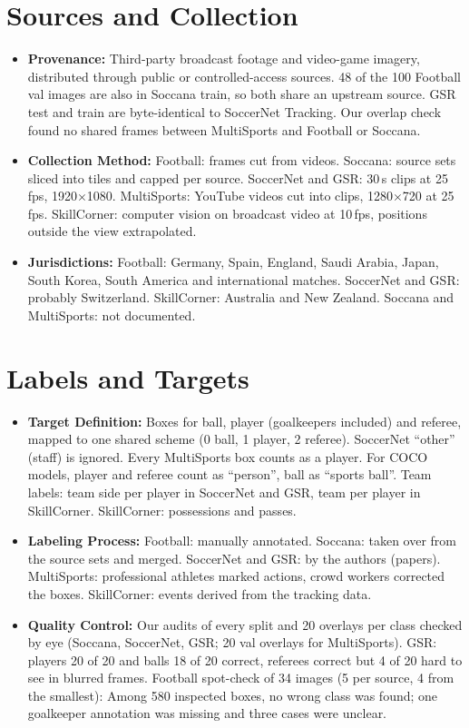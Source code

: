\documentclass[11pt, a4paper]{article}
\begin{document}
\section{Sources and Collection}
\begin{itemize}
    \item \textbf{Provenance:} Third-party broadcast footage and video-game imagery, distributed through public or controlled-access sources. 48 of the 100 Football val images are also in Soccana train, so both share an upstream source. GSR test and train are byte-identical to SoccerNet Tracking. Our overlap check found no shared frames between MultiSports and Football or Soccana.
    \item \textbf{Collection Method:} Football: frames cut from videos. Soccana: source sets sliced into tiles and capped per source. SoccerNet and GSR: 30\,s clips at 25\,fps, 1920$\times$1080. MultiSports: YouTube videos cut into clips, 1280$\times$720 at 25\,fps. SkillCorner: computer vision on broadcast video at 10\,fps, positions outside the view extrapolated.
    \item \textbf{Jurisdictions:} Football: Germany, Spain, England, Saudi Arabia, Japan, South Korea, South America and international matches. SoccerNet and GSR: probably Switzerland. SkillCorner: Australia and New Zealand. Soccana and MultiSports: not documented.
\end{itemize}

\section{Labels and Targets}
\begin{itemize}
    \item \textbf{Target Definition:} Boxes for ball, player (goalkeepers included) and referee, mapped to one shared scheme (0 ball, 1 player, 2 referee). SoccerNet ``other'' (staff) is ignored. Every MultiSports box counts as a player. For COCO models, player and referee count as ``person'', ball as ``sports ball''. Team labels: team side per player in SoccerNet and GSR, team per player in SkillCorner. SkillCorner: possessions and passes.
    \item \textbf{Labeling Process:} Football: manually annotated. Soccana: taken over from the source sets and merged. SoccerNet and GSR: by the authors (papers). MultiSports: professional athletes marked actions, crowd workers corrected the boxes. SkillCorner: events derived from the tracking data.
    \item \textbf{Quality Control:} Our audits of every split and 20 overlays per class checked by eye (Soccana, SoccerNet, GSR; 20 val overlays for MultiSports). GSR: players 20 of 20 and balls 18 of 20 correct, referees correct but 4 of 20 hard to see in blurred frames. Football spot-check of 34 images (5 per source, 4 from the smallest): Among 580 inspected boxes, no wrong class was found; one goalkeeper annotation was missing and three cases were unclear. 
\end{itemize}
\end{document}
